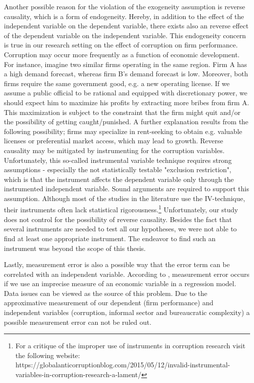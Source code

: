 Another possible reason for the violation of the exogeneity assumption is reverse causality, which is a form of endogeneity. Hereby, in addition to the effect of the independent variable on the dependent variable, there exists also an reverse effect of the dependent variable on the independent variable. This endogeneity concern is true in our research setting on the effect of corruption on firm performance. Corruption may occur more frequently as a function of economic development. For instance, imagine two similar firms operating in the same region. Firm A has a high demand forecast, whereas firm B's demand forecast is low. Moreover, both firms require the same government good, e.g. a new operating license. If we assume a public official to be rational and equipped with discretionary power, we should expect him to maximize his profits by extracting more bribes from firm A. This maximization is subject to the constraint that the firm might quit and/or the possibility of getting caught/punished. A further explanation results from the following possibility; firms may specialize in rent-seeking to obtain e.g. valuable licenses or preferential market access, which may lead to growth. \citep[p. 65]{fisman2007corruption} Reverse causality may be mitigated by instrumenting for the corruption variables. Unfortunately, this so-called instrumental variable technique requires strong assumptions - especially the not statistically testable "exclusion restriction", which is that the instrument affects the dependent variable only through the instrumented independent variable. Sound arguments are required to 
support this assumption. Although most of the studies in the literature use the IV-technique, their instruments often lack statistical rigorousness.\footnote{For a critique of the improper use of instruments in corruption research visit the following website: https://globalanticorruptionblog.com/2015/05/12/invalid-instrumental-variables-in-corruption-research-a-lament/} Unfortunately, our study does not control for the possibility of reverse causality. Besides the fact that several instruments are needed to test all our hypotheses, we were not able to find at least one appropriate instrument. The endeavor to find such an instrument was beyond the scope of this thesis.

Lastly, measurement error is also a possible way that the error term can be correlated with an independent variable. According to \citet[p. 345]{wooldridge}, measurement error occurs if we use an imprecise measure of an economic variable in a regression model. Data issues can be viewed as the source of this problem. \citep[p. 352]{wooldridge} Due to the approximative measurement of our dependent (firm performance) and independent variables (corruption, informal sector and bureaucratic complexity) a possible measurement error can not be ruled out.  \\

